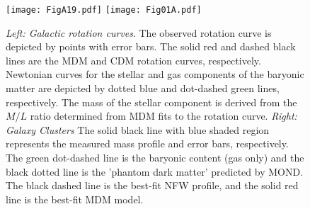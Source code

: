 \documentclass{bjp}
\begin{document}
\begin{figure}
\texttt{[image: FigA19.pdf]} %
\texttt{[image: Fig01A.pdf]} %
\\
  \caption{\textit{Left: Galactic rotation curves}. The observed rotation curve is depicted by points with error bars. The solid red and dashed black lines are the MDM and CDM rotation curves, respectively. Newtonian curves for the stellar and gas components of the baryonic matter are depicted by dotted blue and dot-dashed green lines, respectively. The mass of the stellar component is derived from the 
$M/L$ ratio determined from MDM fits to the rotation curve. \textit{Right: Galaxy Clusters} The solid black line with blue shaded region represents the measured mass profile and error bars, respectively. The green dot-dashed line is the baryonic content (gas only) and the black dotted line is the 'phantom dark matter' predicted by MOND. The black dashed line is the best-fit NFW profile, and the solid red line is the best-fit MDM model.}
  \label{fig:GRC}
\end{figure}


\end{document}

